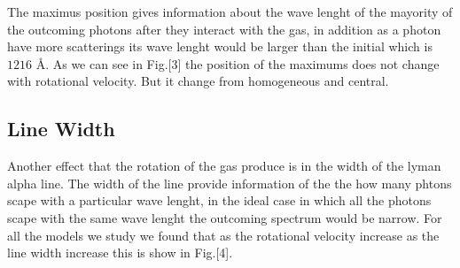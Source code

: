 \documentclass{article}
\theoremstyle{definition}
\theoremstyle{remark}
\begin{document}
The maximus position gives information about the wave lenght of the
mayority of the outcoming photons after they interact with the gas, in
addition as a photon have more scatterings its wave lenght would be
larger than the initial which is $1216$ {\AA}. 
As we can see in Fig.[3] the position of the maximums does not change
with rotational velocity. But it change from homogeneous and central.  

\subsection*{Line Width}

Another effect that the rotation of the gas produce is in the  width
of the lyman alpha line. The width of the line provide information of
the the how many phtons scape with a particular wave lenght, in the
ideal case in which all the photons scape with the same wave lenght
the outcoming spectrum would be narrow. For all the models we study we
found that as the rotational velocity increase as the line width
increase this is show in Fig.[4].\\ 
 
\end{document}
